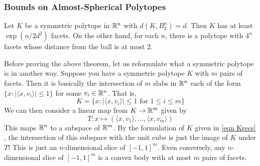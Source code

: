 \subsubsection{Bounds on Almost-Spherical Polytopes}

\begin{ftheo}
\label{approximating sphere to polytope}
Let $K$ be a symmetric polytope in $\mathbb{R}^n$ with $d(K,B_2^n)=d$. Then $K$ has at least $\exp(n/2d^2)$ facets. On the other hand, for each $n$, there is a polytope with $4^n$ facets whose distance from the ball is at most $2$.
\end{ftheo}
Before proving the above theorem, let us reformulate what a symmetric polytope is in another way. Suppose you have a symmetric polytope $K$ with $m$ pairs of facets. Then it is basically the intersection of $m$ slabs in $\mathbb{R}^n$ each of the form $\{x:|\langle x, v_i\rangle| \leq 1\}$ for some $v_i\in\mathbb{R}^n$. That is,
\begin{equation}
\label{eqn Kvecs}
    K = \{x : |\langle x, v_i\rangle|\leq 1 \text{ for }1\leq i\leq m\}
\end{equation}
We can then consider a linear map from $K\to \mathbb{R}^m$ given by
\[ T: x \mapsto (\langle x,v_1\rangle,\ldots,\langle x,v_m\rangle) \]
This maps $\mathbb{R}^n$ to a subspace of $\mathbb{R}^m$. By the formulation of $K$ given in \ref{eqn Kvecs} , the intersection of this subspace with the unit cube is just the image of $K$ under $T$! This is just an $n$-dimensional slice of $[-1,1]^m$. Even conversely, any $n$-dimensional slice of $[-1,1]^m$ is a convex body with at most $m$ pairs of facets.
